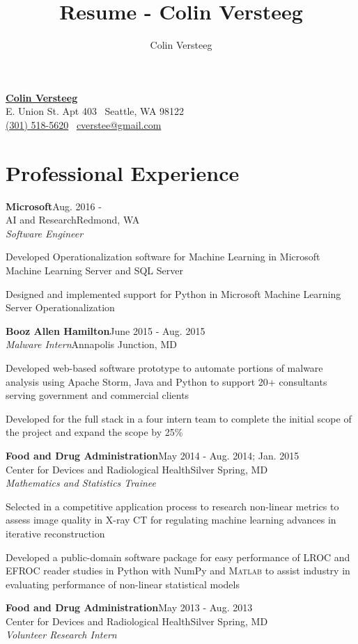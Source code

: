 \documentclass[letterpaper,12pt]{article}
\title{Resume - Colin Versteeg}
\author{Colin Versteeg}
\makeatletter
\def \myrespresectionskip {-.25in}
\def \resumeitemizeskip{0in}
\def \jobskip{.075in}
\newcommand{\myheader}{
\begin{center}
    \href{http://www.linkedin.com/pub/colin-versteeg/5b/26b/1b8}{{\huge\bf\sffamily Colin Versteeg}} \\
   \sffamily 1408 E. Union St. Apt 403 \textbullet \, Seattle, WA 98122 \\ 
\href{callto:3015185620}{\sffamily(301) 518-5620} \textbullet \, \href{mailto:cverstee@gmail.com}{\sffamily cverstee@gmail.com} 
\end{center}
}
\newcommand{\resheading}[5]{
\large{\textbf{#1}}\hfill{\rmfamily\normalsize\textcolor{faded}{#2}} \\
\normalsize{#3}\hfill{\textcolor{faded}{\normalsize#4}}\\
\normalsize{#5}
\normalsize
}
\makeatother
\begin{document}
\myheader
\vspace{-.3in}

\section*{Professional Experience}
\resheading{{Microsoft}}{Aug. 2016 \--}{{AI and Research}}{Redmond, WA}{\emph{Software Engineer}}
{ \footnotesize
\vspace{\resumeitemizeskip}
      \begin{resumeitemize}
	\item{Developed Operationalization software for Machine Learning in Microsoft Machine Learning Server and SQL Server}
	 \item{Designed and implemented support for Python in Microsoft Machine Learning Server Operationalization}
          \end{resumeitemize}
}
\resheading{{Booz Allen Hamilton}}{June 2015 \-- Aug. 2015}{\emph{Malware Intern}}{Annapolis Junction, MD}{}
{ \footnotesize
\vspace{-.2in}
      \begin{resumeitemize}
	\item{Developed web-based software prototype to automate portions of malware analysis using Apache Storm, Java and Python to support 20+ consultants serving government and commercial clients}
	\item{Developed for the full stack in a four intern team to complete the initial scope of the project and expand the scope by 25\%}
          \end{resumeitemize}
}
\vspace{\jobskip}
\resheading{{Food and Drug Administration}}{May 2014 \-- Aug. 2014; Jan. 2015}{{Center for Devices and Radiological Health}}{Silver Spring, MD}{\emph{Mathematics and Statistics Trainee}} 
   { \footnotesize
\vspace{\resumeitemizeskip}
      \begin{resumeitemize}
	 \item{Selected in a competitive application process to research non-linear metrics to assess image quality in {X-ray CT} for regulating machine learning advances in iterative reconstruction}
            \item{Developed a public-domain software package for easy performance of LROC and EFROC reader studies in Python with NumPy and \textsc{Matlab} to assist industry in evaluating performance of non-linear statistical models}
          \end{resumeitemize}
   }
\vspace{\jobskip}
\resheading{{Food and Drug Administration}}{May 2013 \-- Aug. 2013}{{Center for Devices and Radiological Health}}{Silver Spring, MD}{\emph{Volunteer Research Intern}}
   { \footnotesize
\vspace{\resumeitemizeskip}
   }
\vspace{\myrespresectionskip}
\end{document}
